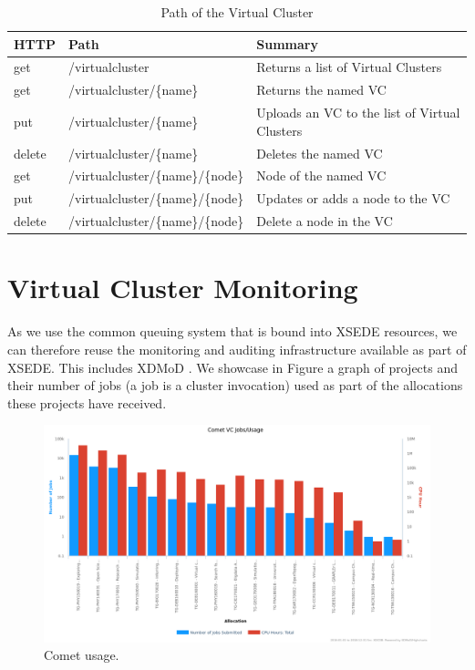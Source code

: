 \documentclass[sigconf,hyphens]{acmart}
\begin{document}
\begin{table}
\caption{Path of the Virtual Cluster}\label{tab:path}
\begin{tabular}{p{}p{}p{}}
\toprule
HTTP & Path & Summary \\
\midrule
get & /virtualcluster & Returns a list of Virtual Clusters \\
get & /virtualcluster/\{name\} & Returns the named VC \\
put & /virtualcluster/\{name\} & Uploads an VC to the list of  Virtual Clusters\\
delete & /virtualcluster/\{name\} & Deletes the named VC \\
get & /virtualcluster/\{name\}/\{node\} & Node of the named VC\\
put & /virtualcluster/\{name\}/\{node\} & Updates or adds a node to the VC\\
delete & /virtualcluster/\{name\}/\{node\} & Delete a node in the VC\\
\bottomrule
\end{tabular}
\end{table}


\section{Virtual Cluster Monitoring}

As we use the common queuing system that is bound into XSEDE
resources, we can therefore reuse the monitoring and auditing
infrastructure available as part of XSEDE. This includes XDMoD
\cite{tas-view}. We showcase in Figure \label{fig:usage} a graph of
projects and their number of jobs (a job is a cluster invocation) used
as part of the allocations these projects have received.

\begin{figure}[h]
  \centering
  \includegraphics[width=\linewidth]{images/xdmod_Comet_VC_Jobs_Usage_2016-01-01_to_2018-12-31.png}
  \caption{Comet usage.}\label{fig:usage}
\end{figure}
\end{document}
